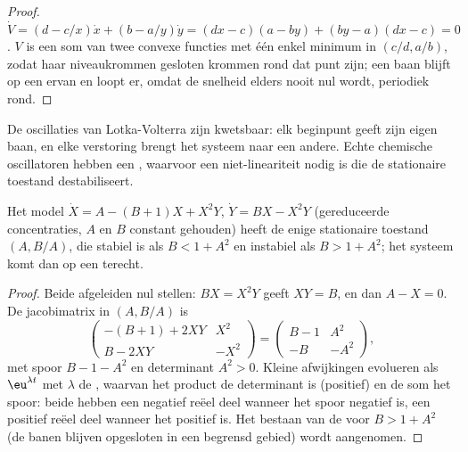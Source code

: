 \begin{proof}
$\dot V = (d - c/x)\dot x + (b - a/y)\dot y = (dx - c)(a - by) + (by - a)(dx - c) = 0$. $V$ is een
som van twee convexe functies met één enkel minimum in $(c/d, a/b)$, zodat
haar niveaukrommen gesloten krommen rond dat punt zijn; een baan blijft op
een ervan en loopt er, omdat de snelheid elders nooit nul wordt,
periodiek rond.
\end{proof}

De oscillaties van Lotka-Volterra zijn kwetsbaar: elk beginpunt geeft zijn
eigen baan, en elke verstoring brengt het systeem naar een andere. Echte
chemische oscillatoren hebben een , waarvoor een
niet-lineariteit nodig is die de stationaire toestand destabiliseert.

\begin{proposition}\label{prop:b3:complex-kinetics:hopf}
Het model $\dot X = A - (B + 1)X + X^2Y$, $\dot Y = BX - X^2Y$ (gereduceerde concentraties,
$A$ en $B$ constant gehouden) heeft de enige stationaire toestand $(A, B/A)$, die
stabiel is als $B < 1 + A^2$ en instabiel als $B > 1 + A^2$; het systeem
komt dan op een  terecht.
\end{proposition}

\begin{proof}
Beide afgeleiden nul stellen: $BX = X^2Y$ geeft $XY = B$, en dan $A - X = 0$. De
jacobimatrix in $(A, B/A)$ is
\[
  \begin{pmatrix} -(B + 1) + 2XY & X^2 \\ B - 2XY & -X^2 \end{pmatrix}
  = \begin{pmatrix} B - 1 & A^2 \\ -B & -A^2 \end{pmatrix},
\]
met spoor $B - 1 - A^2$ en determinant $A^2 > 0$. Kleine afwijkingen
evolueren als
$\eu^{\lambda t}$ met $\lambda$ de , waarvan het product de
determinant is (positief) en de som het spoor: beide hebben een negatief
reëel deel wanneer het spoor negatief is, een positief reëel deel wanneer
het positief is. Het bestaan van de  voor $B > 1 + A^2$ (de
banen blijven opgesloten in een begrensd gebied) wordt aangenomen.
\end{proof}

